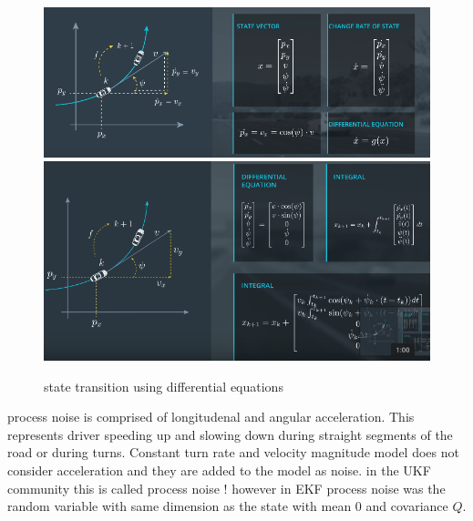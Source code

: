 \documentclass[a4paper,12pt]{article}
\begin{document}
\begin{figure}[h!]
  \caption{state transition using differential equations}
  \centering
    \includegraphics[scale=.5]{2.png}
    \includegraphics[scale=.5]{3.png}
\end{figure}

process noise is comprised of longitudenal and angular acceleration. This represents driver speeding up and slowing down during straight segments of the road or during turns. Constant turn rate and velocity magnitude model does not consider acceleration and they are added to the model as noise. in the UKF community this is called process noise ! however in EKF process noise was the random variable with same dimension as the state with mean $0$ and covariance $Q$.
\end{document}

